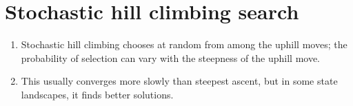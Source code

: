 \section{Stochastic hill climbing search \cite{ai/book/Artificial-Intelligence-A-Modern-Approach/Russell-Norvig}}
\label{AI: Algorithms/Stochastic hill climbing search}



\begin{enumerate}
    \item Stochastic hill climbing chooses at random from among the uphill moves; the probability of selection can vary with the steepness of the uphill move.
    \hfill \cite{ai/book/Artificial-Intelligence-A-Modern-Approach/Russell-Norvig}

    \item This usually converges more slowly than steepest ascent, but in some state landscapes, it finds better solutions.
    \hfill \cite{ai/book/Artificial-Intelligence-A-Modern-Approach/Russell-Norvig}
\end{enumerate}


















